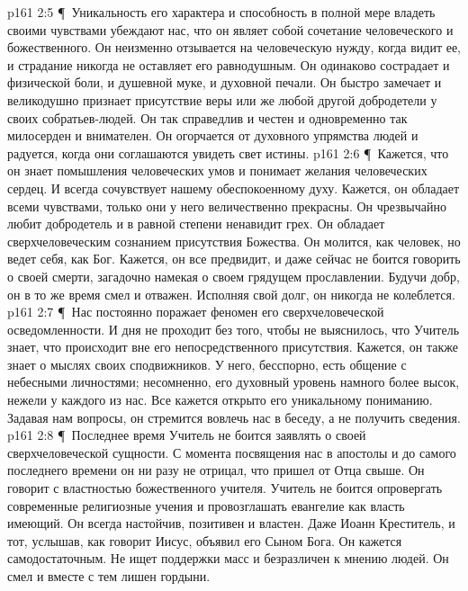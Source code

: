 \vs p161 2:5 \P\ \bibnobreakspace Уникальность его характера и способность в полной мере владеть своими чувствами убеждают нас, что он являет собой сочетание человеческого и божественного. Он неизменно отзывается на человеческую нужду, когда видит ее, и страдание никогда не оставляет его равнодушным. Он одинаково сострадает и физической боли, и душевной муке, и духовной печали. Он быстро замечает и великодушно признает присутствие веры или же любой другой добродетели у своих собратьев\hyp{}людей. Он так справедлив и честен и одновременно так милосерден и внимателен. Он огорчается от духовного упрямства людей и радуется, когда они соглашаются увидеть свет истины.
\vs p161 2:6 \P\ \bibnobreakspace Кажется, что он знает помышления человеческих умов и понимает желания человеческих сердец. И всегда сочувствует нашему обеспокоенному духу. Кажется, он обладает всеми чувствами, только они у него величественно прекрасны. Он чрезвычайно любит добродетель и в равной степени ненавидит грех. Он обладает сверхчеловеческим сознанием присутствия Божества. Он молится, как человек, но ведет себя, как Бог. Кажется, он все предвидит, и даже сейчас не боится говорить о своей смерти, загадочно намекая о своем грядущем прославлении. Будучи добр, он в то же время смел и отважен. Исполняя свой долг, он никогда не колеблется.
\vs p161 2:7 \P\ \bibnobreakspace Нас постоянно поражает феномен его сверхчеловеческой осведомленности. И дня не проходит без того, чтобы не выяснилось, что Учитель знает, что происходит вне его непосредственного присутствия. Кажется, он также знает о мыслях своих сподвижников. У него, бесспорно, есть общение с небесными личностями; несомненно, его духовный уровень намного более высок, нежели у каждого из нас. Все кажется открыто его уникальному пониманию. Задавая нам вопросы, он стремится вовлечь нас в беседу, а не получить сведения.
\vs p161 2:8 \P\ \bibnobreakspace Последнее время Учитель не боится заявлять о своей сверхчеловеческой сущности. С момента посвящения нас в апостолы и до самого последнего времени он ни разу не отрицал, что пришел от Отца свыше. Он говорит с властностью божественного учителя. Учитель не боится опровергать современные религиозные учения и провозглашать евангелие как власть имеющий. Он всегда настойчив, позитивен и властен. Даже Иоанн Креститель, и тот, услышав, как говорит Иисус, объявил его Сыном Бога. Он кажется самодостаточным. Не ищет поддержки масс и безразличен к мнению людей. Он смел и вместе с тем лишен гордыни.
